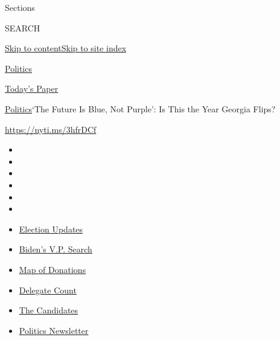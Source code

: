 Sections

SEARCH

\protect\hyperlink{site-content}{Skip to
content}\protect\hyperlink{site-index}{Skip to site index}

\href{https://www.nytimes.com/section/politics}{Politics}

\href{https://myaccount.nytimes.com/auth/login?response_type=cookie\&client_id=vi}{}

\href{https://www.nytimes.com/section/todayspaper}{Today's Paper}

\href{/section/politics}{Politics}\textbar{}`The Future Is Blue, Not
Purple': Is This the Year Georgia Flips?

\url{https://nyti.ms/3hfrDCf}

\begin{itemize}
\item
\item
\item
\item
\item
\item
\end{itemize}

\begin{itemize}
\item
  \href{https://www.nytimes.com/2020/08/04/us/elections/primary-election-michigan-arizona-kansas.html?action=click\&pgtype=Article\&state=default\&region=TOP_BANNER\&context=storylines_menu}{Election
  Updates}
\item
  \href{https://www.nytimes.com/article/biden-vice-president-2020.html?action=click\&pgtype=Article\&state=default\&region=TOP_BANNER\&context=storylines_menu}{Biden's
  V.P. Search}
\item
  \href{https://www.nytimes.com/interactive/2020/07/24/us/politics/trump-biden-campaign-donors.html?action=click\&pgtype=Article\&state=default\&region=TOP_BANNER\&context=storylines_menu}{Map
  of Donations}
\item
  \href{https://www.nytimes.com/interactive/2020/us/elections/delegate-count-primary-results.html?action=click\&pgtype=Article\&state=default\&region=TOP_BANNER\&context=storylines_menu}{Delegate
  Count}
\item
  \href{https://www.nytimes.com/interactive/2019/us/politics/2020-presidential-candidates.html?action=click\&pgtype=Article\&state=default\&region=TOP_BANNER\&context=storylines_menu}{The
  Candidates}
\item
  \href{https://www.nytimes.com/newsletters/politics?action=click\&pgtype=Article\&state=default\&region=TOP_BANNER\&context=storylines_menu}{Politics
  Newsletter}
\end{itemize}

